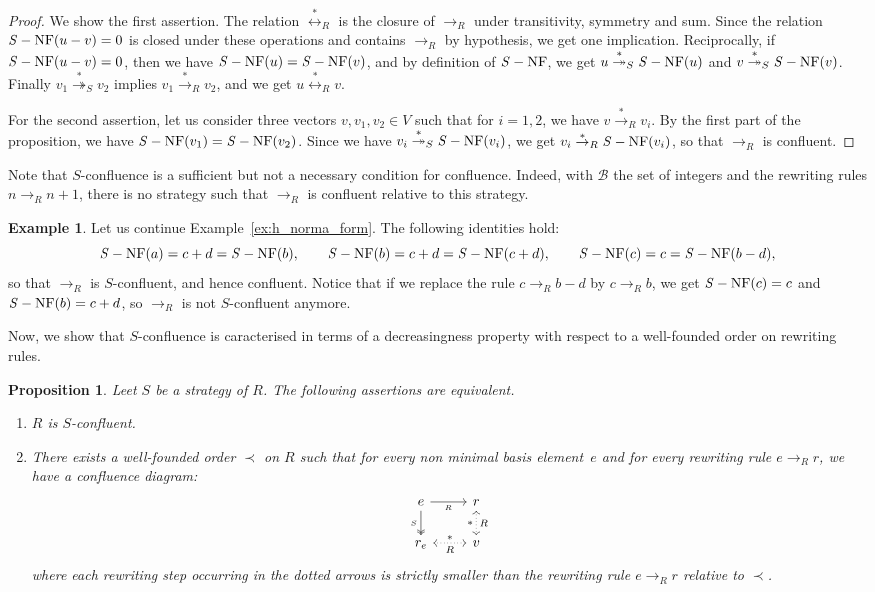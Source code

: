 \documentclass[10pt]{easychair}
\newtheorem{proposition}[theorem]{Proposition}
\theoremstyle{definition}
\newtheorem{example}[theorem]{Example}
\newcommand\basis{\mathscr{B}}
\newcommand\rewR{\to_R}
\newcommand\transR{\overset{*}{\to}_R}
\newcommand\transS{\overset{*}{\twoheadrightarrow}_S}
\newcommand\equivR{\overset{*}{\leftrightarrow}_R}
\DeclareMathOperator{\SNF}{{\it S}-NF}
\begin{document}
\begin{proof}
  We show the first assertion. The relation $\equivR$ is the closure of
  $\rewR$ under transitivity, symmetry and sum. Since the relation
  $\SNF(u-v)=0$ is closed under these operations and contains $\rewR$ by
  hypothesis, we get one implication. Reciprocally, if $\SNF(u-v)=0$,
  then we have $\SNF(u)=\SNF(v)$, and by definition of $\SNF$, we get
  $u\transS\SNF(u)$ and $v\transS\SNF(v)$. Finally $v_1\transS v_2$
  implies $v_1\transR v_2$, and we get $u\equivR v$.

  For the second assertion, let us consider three vectors
  $v,v_1,v_2\in V$ such that for $i=1,2$, we have $v\transR v_i$. By the
  first part of the proposition, we have $\SNF(v_1)=\SNF(v_2)$. Since we
  have $v_i\transS\SNF(v_i)$, we get $v_i\transR\SNF(v_i)$, so that
  $\rewR$ is confluent.
\end{proof}
\smallskip

Note that $S$-confluence is a sufficient but not a necessary condition
for confluence. Indeed, with $\basis$ the set of integers and the
rewriting rules $n\rewR n+1$, there is no strategy such that $\rewR$ is
confluent relative to this strategy.
\smallskip

\begin{example}
  Let us continue Example~\ref{ex:h_norma_form}. The following identities
  hold:
  \[\SNF(a)=c+d=\SNF(b),\qquad\SNF(b)=c+d=\SNF(c+d),\qquad
  \SNF(c)=c=\SNF(b-d),
  \]
  so that $\rewR$ is $S$-confluent, and hence confluent. Notice that if
  we replace the rule $c\rewR b-d$ by $c\rewR b$, we get $\SNF(c)=c$ and
  $\SNF(b)=c+d$, so $\rewR$ is not $S$-confluent anymore. 
\end{example}
\smallskip

Now, we show that $S$-confluence is caracterised in terms of a
decreasingness property with respect to a well-founded order on rewriting
rules.
\smallskip

\begin{proposition}
  Leet $S$ be a strategy of $R$. The following assertions are equivalent.
  \begin{enumerate}
  \item $R$ is $S$-confluent.
  \item There exists a well-founded order $\prec$ on $R$ such that for
    every non minimal basis element~$e$ and for every rewriting rule
    $e\rewR r$, we have a confluence diagram:
    \[\begin{tikzcd}
    e\ar[r, "_R"']\ar[d, twoheadrightarrow, "_S"'] &
    r\ar[d, leftrightarrow, dotted, "*"', "R"]\\
    r_e\ar[r, leftrightarrow, dotted, "*", "R"'] & v
    \end{tikzcd}\]
    where each rewriting step occurring in the dotted arrows is strictly
    smaller than the rewriting rule $e\rewR r$ relative to $\prec$.
  \end{enumerate}
\end{proposition}
\end{document}

